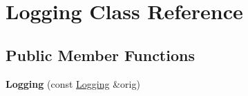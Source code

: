 \hypertarget{classLogging}{\section{Logging Class Reference}
\label{classLogging}
}
\subsection*{Public Member Functions}
\begin{DoxyCompactItemize}
\item 
\hypertarget{classLogging_ac6a1c9ea7776cd74f47bde71e38364da}{{\bfseries Logging} (const \hyperlink{classLogging}{Logging} \&orig)}\label{classLogging_ac6a1c9ea7776cd74f47bde71e38364da}

\end{DoxyCompactItemize}
